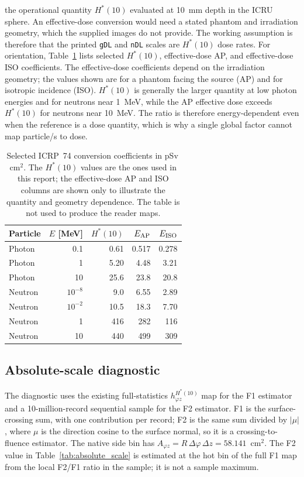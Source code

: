 \documentclass[11pt,a4paper]{article}
\begin{document}
the operational quantity \(H^*(10)\) evaluated at 10~mm depth in the ICRU
sphere.  An effective-dose conversion would need a stated phantom and
irradiation geometry, which the supplied images do not provide.  The working assumption is therefore
that the printed \texttt{gDL} and \texttt{nDL} scales are $H^*(10)$ dose rates.
For orientation, Table~\ref{tab:dose_coeff} lists selected \(H^*(10)\),
effective-dose AP, and effective-dose ISO coefficients.  The effective-dose
coefficients depend on the irradiation geometry; the values shown are for a
phantom facing the source (AP) and for isotropic incidence (ISO).  \(H^*(10)\)
is generally the larger quantity at low photon energies and for neutrons near
1~MeV, while the AP effective dose exceeds \(H^*(10)\) for neutrons near
10~MeV.  The ratio is therefore energy-dependent even when the reference is a
dose quantity, which is why a single global factor cannot map particle/s to
dose.

\begin{table}[H]
\centering
\caption{Selected ICRP~74 conversion coefficients in
pSv\,cm\(^2\).  The \(H^*(10)\) values are the ones used in this report; the
effective-dose AP and ISO columns are shown only to illustrate the
quantity and geometry dependence.  The table is not used to produce the
reader maps.}
\label{tab:dose_coeff}
\footnotesize
\begin{tabular}{@{}l r r r r@{}}
\toprule
Particle & \(E\) [MeV] & \(H^*(10)\) & \(E_{\rm AP}\) & \(E_{\rm ISO}\) \\
\midrule
Photon & 0.1 & 0.61 & 0.517 & 0.278 \\
Photon & 1 & 5.20 & 4.48 & 3.21 \\
Photon & 10 & 25.6 & 23.8 & 20.8 \\
\midrule
Neutron & \(10^{-8}\) & 9.0 & 6.55 & 2.89 \\
Neutron & \(10^{-2}\) & 10.5 & 18.3 & 7.70 \\
Neutron & 1 & 416 & 282 & 116 \\
Neutron & 10 & 440 & 499 & 309 \\
\bottomrule
\end{tabular}
\end{table}
\subsection{Absolute-scale diagnostic}\label{sec:absolute_scale}

The diagnostic uses the existing full-statistics $h^{H^*(10)}_{\varphi z}$ map
for the F1 estimator and a 10-million-record sequential sample for the F2
estimator.  F1 is the surface-crossing sum, with one contribution per record;
F2 is the same sum divided by $|\mu|$, where $\mu$ is the direction cosine to
the surface normal, so it is a crossing-to-fluence estimator.  The native side
bin has
$A_{\varphi z}=R\,\Delta\varphi\,\Delta z=58.141$~cm$^2$.  The F2 value in
Table~\ref{tab:absolute_scale} is estimated at the hot bin of the full F1 map
from the local F2/F1 ratio in the sample; it is not a sample maximum.
\end{document}
